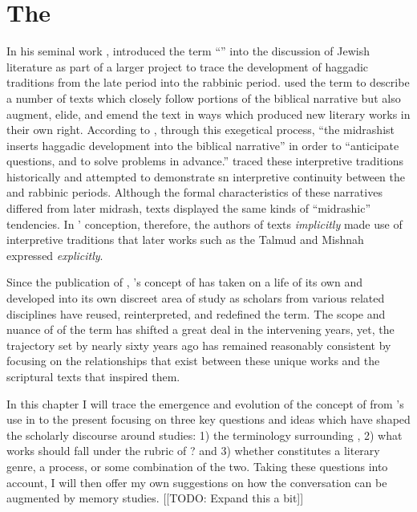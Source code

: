 
\chapter{The \RwB}

In his seminal work , \Vermes introduced the term ``\rwB'' into the discussion of \secondtemple Jewish literature as part of a larger project to trace the development of haggadic traditions from the late \secondtemple period into the rabbinic period. \vermes used the term \rwB to describe a number of texts which closely follow portions of the biblical narrative but also augment, elide, and emend the text in ways which produced new literary works in their own right. According to \vermes, through this exegetical process, ``the midrashist inserts haggadic development into the biblical narrative'' in order to ``anticipate questions, and to solve problems in advance.''\autocites[95]{vermes1961}[see also][]{vermes_zsengeller2014} \vermes traced these interpretive traditions historically and attempted to demonstrate sn interpretive continuity between the \secondtemple and rabbinic periods. Although the formal characteristics of these narratives differed from later midrash, \rwB texts displayed the same kinds of ``midrashic'' tendencies. In \vermes' conception, therefore, the authors of \rwB texts \emph{implicitly} made use of interpretive traditions that later works such as the Talmud and Mishnah expressed \emph{explicitly}. 

Since the publication of , \vermes's concept of \rwB has taken on a life of its own and developed into its own discreet area of study as scholars from various related disciplines have reused, reinterpreted, and redefined the term. The scope and nuance of of the term \rwB has shifted a great deal in the intervening years, yet, the trajectory set by \vermes nearly sixty years ago has remained reasonably consistent by focusing on the relationships that exist between these unique works and the scriptural texts that inspired them. 

In this chapter I will trace the emergence and evolution of the concept of \rwB from \vermes's use in  to the present focusing on three key questions and ideas which have shaped the scholarly discourse around \rwB studies: 1) the terminology surrounding \rwB, 2) what works should fall under the rubric of \rwB? and 3) whether \rwB constitutes a literary genre, a process, or some combination of the two. Taking these questions into account, I will then offer my own suggestions on how the \rwb conversation can be augmented by memory studies. [[TODO: Expand this a bit]]

